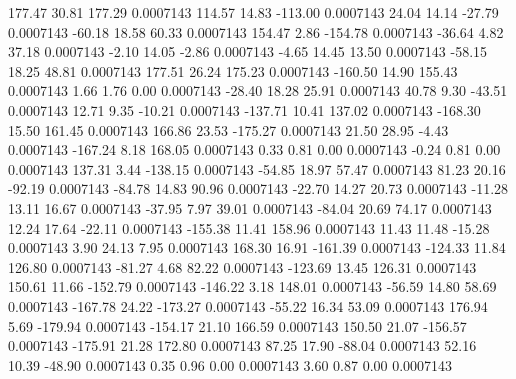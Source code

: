       177.47       30.81      177.29     0.0007143
      114.57       14.83     -113.00     0.0007143
       24.04       14.14      -27.79     0.0007143
      -60.18       18.58       60.33     0.0007143
      154.47        2.86     -154.78     0.0007143
      -36.64        4.82       37.18     0.0007143
       -2.10       14.05       -2.86     0.0007143
       -4.65       14.45       13.50     0.0007143
      -58.15       18.25       48.81     0.0007143
      177.51       26.24      175.23     0.0007143
     -160.50       14.90      155.43     0.0007143
        1.66        1.76        0.00     0.0007143
      -28.40       18.28       25.91     0.0007143
       40.78        9.30      -43.51     0.0007143
       12.71        9.35      -10.21     0.0007143
     -137.71       10.41      137.02     0.0007143
     -168.30       15.50      161.45     0.0007143
      166.86       23.53     -175.27     0.0007143
       21.50       28.95       -4.43     0.0007143
     -167.24        8.18      168.05     0.0007143
        0.33        0.81        0.00     0.0007143
       -0.24        0.81        0.00     0.0007143
      137.31        3.44     -138.15     0.0007143
      -54.85       18.97       57.47     0.0007143
       81.23       20.16      -92.19     0.0007143
      -84.78       14.83       90.96     0.0007143
      -22.70       14.27       20.73     0.0007143
      -11.28       13.11       16.67     0.0007143
      -37.95        7.97       39.01     0.0007143
      -84.04       20.69       74.17     0.0007143
       12.24       17.64      -22.11     0.0007143
     -155.38       11.41      158.96     0.0007143
       11.43       11.48      -15.28     0.0007143
        3.90       24.13        7.95     0.0007143
      168.30       16.91     -161.39     0.0007143
     -124.33       11.84      126.80     0.0007143
      -81.27        4.68       82.22     0.0007143
     -123.69       13.45      126.31     0.0007143
      150.61       11.66     -152.79     0.0007143
     -146.22        3.18      148.01     0.0007143
      -56.59       14.80       58.69     0.0007143
     -167.78       24.22     -173.27     0.0007143
      -55.22       16.34       53.09     0.0007143
      176.94        5.69     -179.94     0.0007143
     -154.17       21.10      166.59     0.0007143
      150.50       21.07     -156.57     0.0007143
     -175.91       21.28      172.80     0.0007143
       87.25       17.90      -88.04     0.0007143
       52.16       10.39      -48.90     0.0007143
        0.35        0.96        0.00     0.0007143
        3.60        0.87        0.00     0.0007143
